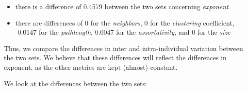 \documentclass[
]{article}
\providecommand{\tightlist}{%
  \setlength{\itemsep}{0pt}\setlength{\parskip}{0pt}}
\begin{document}
\begin{itemize}
\tightlist
\item
  there is a difference of 0.4579 between the two sets concerning
  \emph{exponent}
\item
  there are differences of 0 for the \emph{neighbors}, 0 for the
  \emph{clustering} coefficient, -0.0147 for the \emph{pathlength},
  0.0047 for the \emph{assortativity}, and 0 for the \emph{size}
\end{itemize}

Thus, we compare the differences in inter and intra-individual variation
between the two sets. We believe that these differences will reflect the
differences in exponent, as the other metrics are kept (almost)
constant.

We look at the differences between the two sets:
\end{document}
